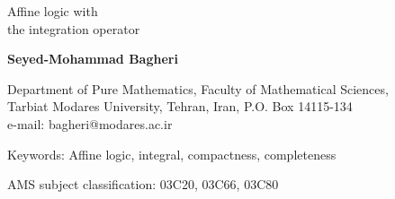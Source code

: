 \documentclass[12pt]{article}
\begin{document}
\begin{center}
{\Large\sc Affine logic with\\ the integration operator}
\bigskip

{{\bf Seyed-Mohammad Bagheri}}
\vspace{5mm}

{\footnotesize {\footnotesize Department of Pure Mathematics,
Faculty of Mathematical Sciences,\\
Tarbiat Modares University, Tehran, Iran, P.O. Box 14115-134}\\
e-mail: bagheri@modares.ac.ir}
\end{center}

\begin{abstract}
Affine continuous logic is extended to affine integration logic. Affine compactness theorem is proved by both the ultramean
construction and Henkin's method. Also, a proof system and a completeness theorem are given.
An appropriate variant of the Keisler-Shelah isomorphism theorem holds in this setting.
This helps us to characterize non-forking extensions in affine stable theories
by means of the notion of elementary embedding in the expanded logic.
\end{abstract}

{\sc Keywords}: Affine logic, integral, compactness, completeness

{\small {\sc AMS subject classification:} 03C20, 03C66, 03C80}
\end{document}

